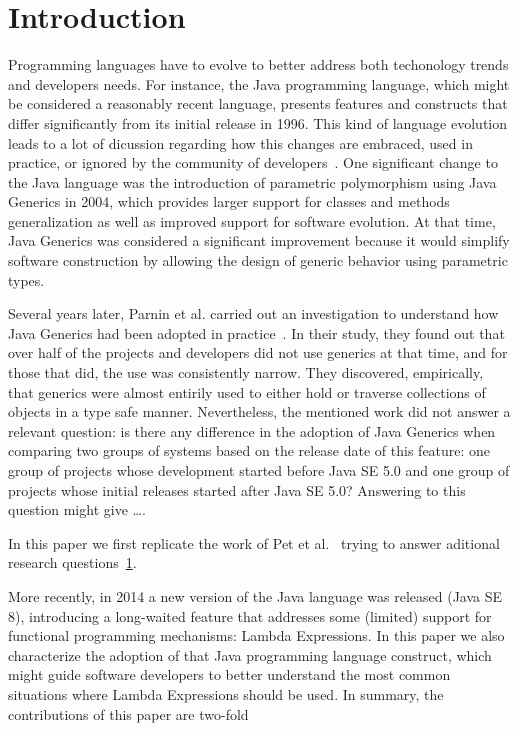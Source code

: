 \section{Introduction}
Programming languages have to evolve to better address both techonology 
trends and developers needs. For instance, the Java programming language, which might be 
considered a reasonably recent language, presents features and constructs that 
differ significantly from its initial release in 1996. This kind of 
language evolution leads to a lot of dicussion regarding 
how this changes are embraced, used in practice, or ignored by the community of 
developers~\cite{}. One significant change to the Java language was 
the introduction of parametric polymorphism using Java Generics in 2004, which 
provides larger support for classes and methods generalization as well as 
improved support for software evolution. At that time, Java Generics 
was considered a significant improvement because it would simplify 
software construction by allowing the design of generic behavior using 
parametric types.

Several years later, Parnin et al. carried out an investigation to understand 
how Java Generics had been adopted in practice~\cite{}. 
In their study, they found out that over half of the projects and developers did not use generics at that time, and for those that did, the use was consistently narrow. They discovered, empirically, that generics were almost entirily used to either hold or traverse collections of objects in a type safe manner. 
Nevertheless, the mentioned work did not answer a relevant question: is there 
any difference in the adoption of Java Generics when comparing two 
groups of systems based on the release date of this feature: one group of 
projects whose development started before Java SE 5.0 and one group of projects whose initial releases started after Java SE 5.0? 
{\color{red}Answering to this question might give \ldots}.

In this paper we first replicate the work of 
Pet et al.~\cite{} trying to answer aditional research questions~\ref{}. 

More recently, in 2014 a new version of the Java language was released (Java SE 8), introducing a long-waited feature that addresses some 
(limited) support for functional programming mechanisms: Lambda Expressions. In this paper we also characterize the adoption of that 
Java programming language construct, which might guide software 
developers to better understand the most common situations 
where Lambda Expressions should be used. In summary, the contributions of this paper are two-fold

